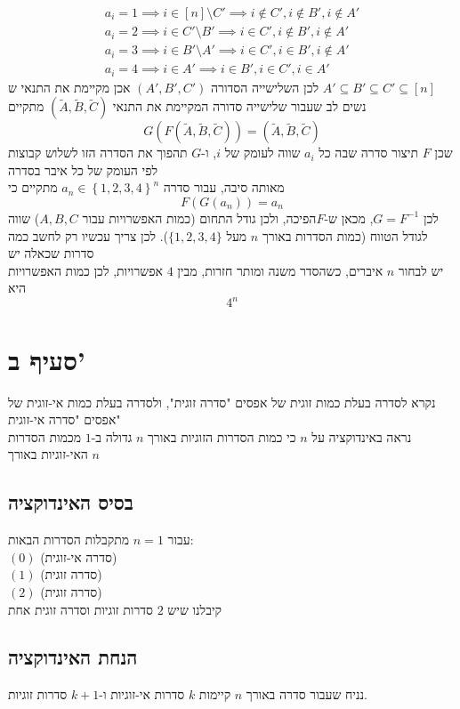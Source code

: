 \documentclass[12pt, titlepage]{article}
\begin{document}
\begin{gather*}
    a_i=1\implies i\in \left[n\right]\setminus C' \implies i\notin C' , i \notin B' , i \notin A'\\
a_i = 2 \implies i \in C' \setminus B' \implies i \in C' , i \notin B' , i \notin A' \\
a_i = 3 \implies i \in B' \setminus A' \implies i \in C', i \in B' , i \notin A'\\
a_i = 4 \implies i \in A' \implies  i \in B' , i \in C', i \in A'
\end{gather*}
לכן השלישייה הסדורה $\left(A',B',C'\right)$ אכן מקיימת את התנאי ש $A'\subseteq B'\subseteq C'\subseteq \left[n\right]$\\
נשים לב שעבור שלישייה סדורה המקיימת את התנאי $\left(\tilde{A},\tilde{B},\tilde{C}\right)$ מתקיים
\[
    G\left(F\left(\tilde{A},\tilde{B},\tilde{C}\right)\right)=\left(\tilde{A}, \tilde{B},\tilde{C}\right)
\]
שכן $F$ תיצור סדרה שבה כל $a_i$ שווה לעומק של $i$, ו-$G$ תהפוך את הסדרה הזו לשלוש קבוצות לפי העומק של כל איבר בסדרה\\
מאותה סיבה, עבור סדרה $a_n \in \left\{1,2,3,4\right\}^n$ מתקיים כי
\[
    F\left(G\left(a_n\right)\right) = a_n
\]
לכן $G=F^{-1}$, מכאן ש-$F$הפיכה, ולכן גודל התחום (כמות האפשרויות עבור $A,B,C$) שווה לגודל הטווח (כמות הסדרות באורך $n$ מעל $\{1,2,3,4\}$). לכן צריך עכשיו רק לחשב כמה סדרות שכאלה יש\\
יש לבחור $n$ איברים, כשהסדר משנה ומותר חזרות, מבין $4$ אפשרויות, לכן כמות האפשרויות היא
\[
    \boxed{4^n}
\]
\section*{סעיף ב'}
נקרא לסדרה בעלת כמות זוגית של אפסים "סדרה זוגית", ולסדרה בעלת כמות אי-זוגית של אפסים "סדרה אי-זוגית" \\
נראה באינדוקציה על $n$ כי כמות הסדרות הזוגיות באורך $n$ גדולה ב-$1$ מכמות הסדרות האי-זוגיות באורך $n$
\subsection*{בסיס האינדוקציה}
עבור $n=1$ מתקבלות הסדרות הבאות:\\
$\left(0\right)$ (סדרה אי-זוגית) \\
$\left(1\right)$ (סדרה זוגית) \\
$\left(2\right)$ (סדרה זוגית) \\
קיבלנו שיש $2$ סדרות זוגיות וסדרה זוגית אחת
\subsection*{הנחת האינדוקציה}
נניח שעבור סדרה באורך $n$ קיימות $k$ סדרות אי-זוגיות ו-$k+1$ סדרות זוגיות.
\end{document}
